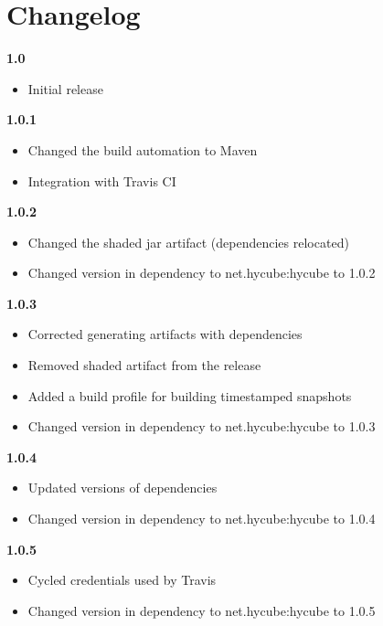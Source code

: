 \chapter{Changelog}

\noindent
\textbf{1.0}
\begin{itemize}
	\renewcommand{\labelitemi}{$\bullet$}
	\item Initial release
\end{itemize}

\noindent
\textbf{1.0.1}
\begin{itemize}
	\renewcommand{\labelitemi}{$\bullet$}
	\item Changed the build automation to Maven
	\item Integration with Travis CI
\end{itemize}

\noindent
\textbf{1.0.2}
\begin{itemize}
	\renewcommand{\labelitemi}{$\bullet$}
	\item Changed the shaded jar artifact (dependencies relocated)
	\item Changed version in dependency to net.hycube:hycube to 1.0.2
\end{itemize}

\noindent
\textbf{1.0.3}
\begin{itemize}
	\renewcommand{\labelitemi}{$\bullet$}
	\item Corrected generating artifacts with dependencies
	\item Removed shaded artifact from the release
	\item Added a build profile for building timestamped snapshots
	\item Changed version in dependency to net.hycube:hycube to 1.0.3
\end{itemize}

\noindent
\textbf{1.0.4}
\begin{itemize}
	\renewcommand{\labelitemi}{$\bullet$}
	\item Updated versions of dependencies
	\item Changed version in dependency to net.hycube:hycube to 1.0.4
\end{itemize}

\noindent
\textbf{1.0.5}
\begin{itemize}
	\renewcommand{\labelitemi}{$\bullet$}
	\item Cycled credentials used by Travis
	\item Changed version in dependency to net.hycube:hycube to 1.0.5
\end{itemize}





